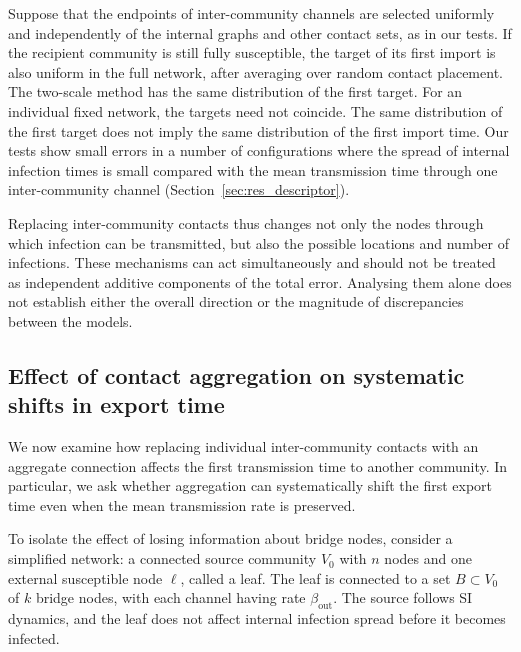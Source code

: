 \documentclass[a4paper,fleqn]{cas-sc}
\begin{document}
\begin{remark}
\label{rem:placement}
Suppose that the endpoints of inter-community channels are selected uniformly and independently of the internal graphs and other contact sets, as in our tests. If the recipient community is still fully susceptible, the target of its first import is also uniform in the full network, after averaging over random contact placement. The two-scale method has the same distribution of the first target. For an individual fixed network, the targets need not coincide. The same distribution of the first target does not imply the same distribution of the first import time. Our tests show small errors in a number of configurations where the spread of internal infection times is small compared with the mean transmission time through one inter-community channel (Section~\ref*{sec:res_descriptor}).
\end{remark}

Replacing inter-community contacts thus changes not only the nodes through which infection can be transmitted, but also the possible locations and number of infections. These mechanisms can act simultaneously and should not be treated as independent additive components of the total error. Analysing them alone does not establish either the overall direction or the magnitude of discrepancies between the models.

\subsection{Effect of contact aggregation on systematic shifts in export time}
\label{sec:single_export}

We now examine how replacing individual inter-community contacts with an aggregate connection affects the first transmission time to another community. In particular, we ask whether aggregation can systematically shift the first export time even when the mean transmission rate is preserved.

To isolate the effect of losing information about bridge nodes, consider a simplified network: a connected source community $V_0$ with $n$ nodes and one external susceptible node $\ell$, called a leaf. The leaf is connected to a set $B\subset V_0$ of $k$ bridge nodes, with each channel having rate $\beta_{\mathrm{out}}$. The source follows SI dynamics, and the leaf does not affect internal infection spread before it becomes infected.
\end{document}
